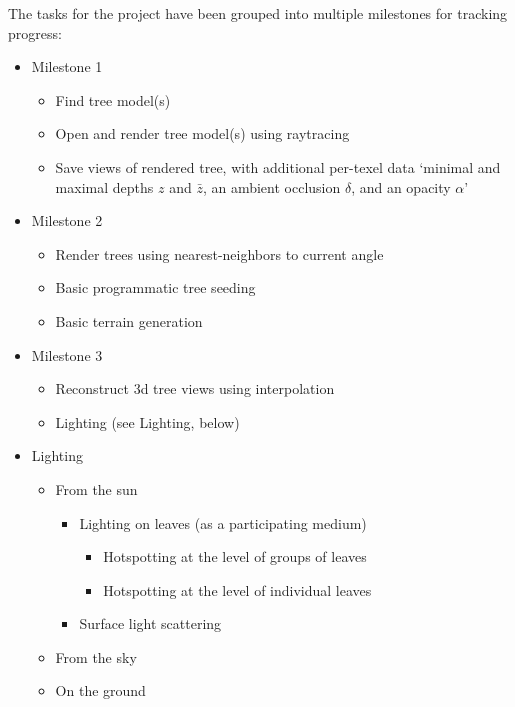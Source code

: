 \documentclass{article}
\begin{document}
The tasks for the project have been grouped into multiple milestones for tracking progress:

\begin{itemize}
\item Milestone 1
\begin{itemize}
\item Find tree model(s)
\item Open and render tree model(s) using raytracing
\item Save views of rendered tree, with additional per-texel data ‘minimal and maximal depths $z$ and $\bar{z}$, an ambient occlusion $\delta$, and an opacity $\alpha$’\cite{trees}
\end{itemize}

\item Milestone 2
\begin{itemize}
\item Render trees using nearest-neighbors to current angle
\item Basic programmatic tree seeding
\item Basic terrain generation
\end{itemize}

\item Milestone 3
\begin{itemize}
\item Reconstruct 3d tree views using interpolation
\item Lighting (see Lighting, below)
\end{itemize}

\item Lighting
\begin{itemize}
\item From the sun
\begin{itemize}
\item Lighting on leaves (as a participating medium)
\begin{itemize}
\item Hotspotting at the level of groups of leaves
\item Hotspotting at the level of individual leaves
\end{itemize}

\item Surface light scattering
\end{itemize}

\item From the sky
\item On the ground
\end{itemize}

\end{itemize}
\end{document}
